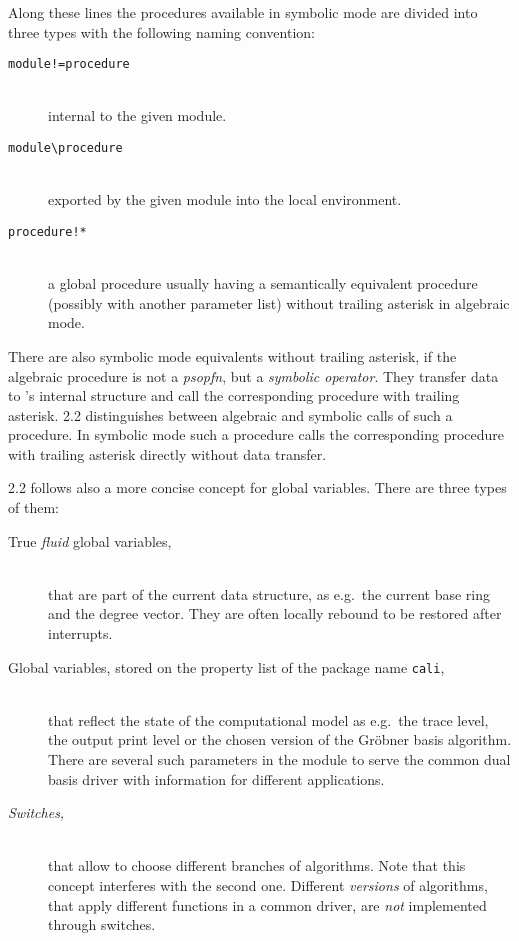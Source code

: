 Along these lines the  procedures available in symbolic mode are
divided into three types with the following naming convention:
\begin{description}
\item[\normalfont\texttt{module!=procedure}]\mbox{}\\
  internal to the given module.

\item[\normalfont\texttt{module\textbackslash procedure}]\mbox{}\\
  exported by the given module into the local  environment.

\item[\normalfont\texttt{procedure!*}]\mbox{}\\
  a global procedure usually having a semantically equivalent
procedure (possibly with another parameter list) without trailing
asterisk in algebraic mode.
\end{description}
There are also symbolic mode equivalents without trailing asterisk, if
the algebraic procedure is not a \emph{psopfn}, but a \emph{symbolic
operator}. They transfer data to 's internal structure and call
the corresponding procedure with trailing asterisk.  2.2
distinguishes between algebraic and symbolic calls of such a
procedure. In symbolic mode such a procedure calls the corresponding
procedure with trailing asterisk directly without data transfer.
\medskip

 2.2 follows also a more concise concept for global
variables. There are three types of them:
\begin{description}
\item[\normalfont True \emph{fluid} global variables,]\mbox{}\\
that are part of the current data structure, as e.g.\ the current
base ring and the degree vector. They are often locally rebound to be
restored after interrupts.

\item[\normalfont Global variables, stored on the property list of the package name \texttt{cali},]\mbox{}\\ 
that reflect the state of the computational model as e.g.\ the
trace level, the output print level or the chosen version of the Gr\"obner
basis algorithm. There are several such parameters in the module
 to serve the common dual basis driver with
information for different applications.

\item[\normalfont\emph{Switches,}]\mbox{}\\ 
that allow to choose different branches of algorithms. Note that
this concept interferes with the second one. Different \emph{versions}
of algorithms, that apply different functions in a common driver, are
\emph{not} implemented through switches.
\end{description}

